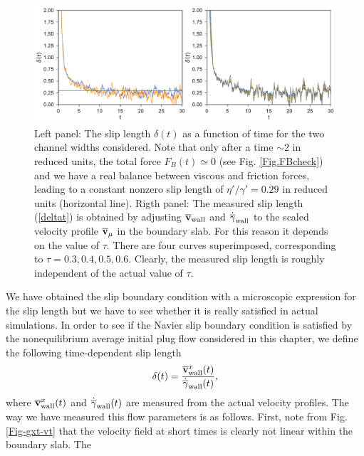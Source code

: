 \documentclass[b5paper,openright,10pt]{book}
\begin{document}
\begin{figure}[]
\includegraphics[width=\linewidth]{Slipt-17nodes-WALLS}
\caption[The slip length for two channel with different width]{Left panel: The slip length $\delta(t)$ as a function of time for the two
  channel widths considered.  Note that only  after a time $\sim 2$ in
  reduced  units,   the  total   force  $F_B(t)\simeq  0$   (see  Fig.
  \ref{Fig.FBcheck}) and  we have a  real balance between  viscous and
  friction  forces, leading  to  a constant  nonzero  slip length  of
  ${\eta'}/{\gamma'}= 0.29$  in reduced units (horizontal  line). Rigth panel: The  measured  slip  length  (\ref{deltat})  is  obtained  by
  adjusting       $\overline{\bf        v}_{\rm       wall}$       and
  $\dot{\overline{\gamma}}_{\rm  wall}$ to  the scaled  velocity profile
  $\overline{\bf  v}_\mu$ in  the boundary  slab. For  this reason  it
  depends on the value of  $\tau$. There are four curves superimposed,
  corresponding  to  $\tau=0.3,0.4,0.5,0.6$.  Clearly, the  measured  slip
  length is roughly independent of the actual value of $\tau$.}
\label{Fig:delta}
\end{figure}
We  have  obtained the  slip  boundary  condition with  a  microscopic
expression for the slip length but we  have to see whether it is really
satisfied in actual  simulations.  In order to see if  the Navier slip
boundary condition is satisfied by the nonequilibrium average initial
plug  flow  considered   in  this  chapter,  we   define  the  following
time-dependent slip length
\begin{align}
  \delta(t)=\frac{\overline{\bf v}^x_{\rm wall}(t)}{\dot{\overline{\gamma}}_{\rm wall}(t)},
\label{deltat}
\end{align}
where        $\overline{\bf       v}^x_{\rm        wall}(t)$       and
$\dot{\overline{\gamma}}_{\rm wall}(t)$  are measured from  the actual
velocity profiles. The way we have measured this flow parameters is as
follows. First, note  from Fig. \ref{Fig-gxt-vt} that the velocity field at
short  times is  clearly not  linear  within the  boundary slab.   The
\end{document}

